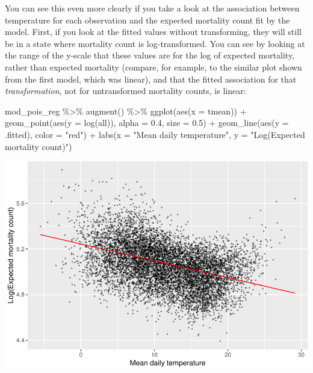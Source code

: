 \documentclass[
]{book}
\newenvironment{Shaded}{\begin{snugshade}}{\end{snugshade}}
\newcommand{\AttributeTok}[1]{\textcolor[rgb]{0.77,0.63,0.00}{#1}}
\newcommand{\FloatTok}[1]{\textcolor[rgb]{0.00,0.00,0.81}{#1}}
\newcommand{\FunctionTok}[1]{\textcolor[rgb]{0.00,0.00,0.00}{#1}}
\newcommand{\NormalTok}[1]{#1}
\newcommand{\SpecialCharTok}[1]{\textcolor[rgb]{0.00,0.00,0.00}{#1}}
\newcommand{\StringTok}[1]{\textcolor[rgb]{0.31,0.60,0.02}{#1}}
\begin{document}
You can see this even more clearly if you take a look at the association between
temperature for each observation and the expected mortality count fit by the
model. First, if you look at the fitted values without transforming, they
will still be in a state where mortality count is log-transformed. You can
see by looking at the range of the y-scale that these values are for the log
of expected mortality, rather than expected mortality (compare, for example, to
the similar plot shown from the first model, which was linear), and that the fitted
association for that \emph{transformation}, not for untransformed mortality counts, is linear:

\begin{Shaded}
\begin{Highlighting}[]
\NormalTok{mod\_pois\_reg }\SpecialCharTok{\%\textgreater{}\%} 
  \FunctionTok{augment}\NormalTok{() }\SpecialCharTok{\%\textgreater{}\%} 
  \FunctionTok{ggplot}\NormalTok{(}\FunctionTok{aes}\NormalTok{(}\AttributeTok{x =}\NormalTok{ tmean)) }\SpecialCharTok{+} 
  \FunctionTok{geom\_point}\NormalTok{(}\FunctionTok{aes}\NormalTok{(}\AttributeTok{y =} \FunctionTok{log}\NormalTok{(all)), }\AttributeTok{alpha =} \FloatTok{0.4}\NormalTok{, }\AttributeTok{size =} \FloatTok{0.5}\NormalTok{) }\SpecialCharTok{+} 
  \FunctionTok{geom\_line}\NormalTok{(}\FunctionTok{aes}\NormalTok{(}\AttributeTok{y =}\NormalTok{ .fitted), }\AttributeTok{color =} \StringTok{"red"}\NormalTok{) }\SpecialCharTok{+} 
  \FunctionTok{labs}\NormalTok{(}\AttributeTok{x =} \StringTok{"Mean daily temperature"}\NormalTok{, }\AttributeTok{y =} \StringTok{"Log(Expected mortality count)"}\NormalTok{)}
\end{Highlighting}
\end{Shaded}

\includegraphics{adv_epi_analysis_files/figure-latex/unnamed-chunk-32-1.pdf}
\end{document}
